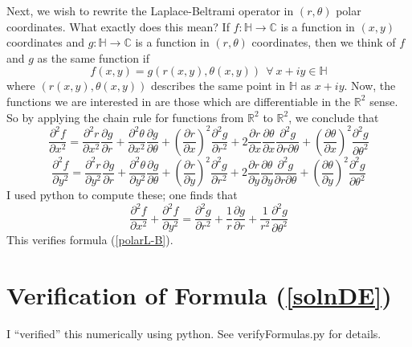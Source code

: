 \documentclass[]{article}
\begin{document}
Next, we wish to rewrite the Laplace-Beltrami operator in $(r, \theta)$ polar coordinates.
What exactly does this mean?
If $f : \mathbb{H} \rightarrow \mathbb{C}$ is a function in $(x, y)$ coordinates and $g : \mathbb{H} \rightarrow \mathbb{C}$ is a function in $(r, \theta)$ coordinates, then we think of $f$ and $g$ as the same function if
$$
f(x, y) = g(r(x, y), \theta(x, y)) ~~\forall~x + iy \in \mathbb{H}
$$
where $(r(x, y), \theta(x, y))$ describes the same point in $\mathbb{H}$ as $x + iy$.
Now, the functions we are interested in are those which are differentiable in the $\mathbb{R}^2$ sense.
So by applying the chain rule for functions from $\mathbb{R}^2$ to $\mathbb{R}^2$, we conclude that
$$
\frac{\partial^2f}{\partial x^2} =
\frac{\partial^2r}{\partial x^2}\frac{\partial g}{\partial r} +
\frac{\partial^2\theta}{\partial x^2}\frac{\partial g}{\partial\theta} +
\left(\frac{\partial r}{\partial x}\right)^2\frac{\partial^2 g}{\partial r^2} +
2\frac{\partial r}{\partial x}\frac{\partial\theta}{\partial x}\frac{\partial^2 g}{\partial r\partial\theta} +
\left(\frac{\partial\theta}{\partial x}\right)^2\frac{\partial^2 g}{\partial\theta^2} $$$$
\frac{\partial^2f}{\partial y^2} =
\frac{\partial^2 r}{\partial y^2}\frac{\partial g}{\partial r} +
\frac{\partial^2\theta}{\partial y^2}\frac{\partial g}{\partial\theta} +
\left(\frac{\partial r}{\partial y}\right)^2\frac{\partial^2 g}{\partial r^2} +
2\frac{\partial r}{\partial y}\frac{\partial\theta}{\partial y}\frac{\partial^2 g}{\partial r\partial\theta} +
\left(\frac{\partial\theta}{\partial y}\right)^2\frac{\partial^2 g}{\partial\theta^2}
$$
I used python to compute these; one finds that
$$
\frac{\partial^2f}{\partial x^2} + \frac{\partial^2f}{\partial y^2} =
\frac{\partial^2 g}{\partial r^2} + \frac{1}{r}\frac{\partial g}{\partial r} + \frac{1}{r^2}\frac{\partial^2g}{\partial\theta^2}
$$
This verifies formula (\ref{polarL-B}).

\section*{Verification of Formula (\ref{solnDE})}

I ``verified'' this numerically using python.
See verifyFormulas.py for details.
	
\end{document}
